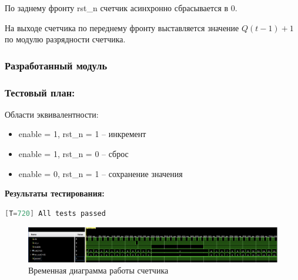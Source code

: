 \documentclass[12pt,onecolumn]{article}
\begin{document}
По заднему фронту rst\_n счетчик асинхронно сбрасывается в 0.

На выходе счетчика по переднему фронту выставляется значение $Q(t-1) + 1$ по модулю разрядности счетчика.
\subsubsection{Разработанный модуль}

\subsubsection{Тестовый план:}
Области эквивалентности:
\begin{itemize}
  \item enable = 1, rst\_n = 1 -- инкремент
  \item enable = 1, rst\_n = 0 -- сброс
  \item enable = 0, rst\_n = 1 -- сохранение значения
\end{itemize}

\textbf{Результаты тестирования:}

\begin{lstlisting}[language=verilog]
  [T=720] All tests passed
\end{lstlisting}

\begin{figure}[H]
  \centering
  \includegraphics[width=\textwidth]{image/counter-diagram.png}
  \caption{Временная диаграмма работы счетчика}
\end{figure}
\end{document}
